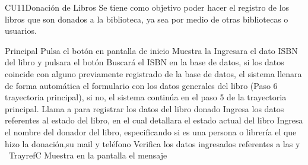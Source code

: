 	\begin{UseCase}{CU11}{Donación de Libros}{
		Se tiene como objetivo poder hacer el registro de los libros que son donados a la biblioteca, ya sea por medio de otras bibliotecas o usuarios.
}
	\end{UseCase}

	\begin{UCtrayectoria}{Principal}
		\UCpaso [\UCactor]Pulsa el botón  en pantalla de inicio
		\UCpaso Muestra la 
		\UCpaso [\UCactor] Ingresara el dato ISBN del libro y pulsara el botón  
		\UCpaso Buscará el ISBN en la base de datos, si los datos coincide con alguno previamente registrado de la base de datos, el sistema llenara de forma automática el formulario con los datos generales del libro (Paso 6 trayectoria principal), si no, el sistema continúa en el paso 5 de la trayectoria principal.
		\UCpaso [\UCactor] Llama a  para registrar los datos del libro donado
		\UCpaso [\UCactor] Ingresa los datos referentes al estado del libro, en el cual detallara el estado actual del libro
		\UCpaso [\UCactor] Ingresa el nombre del donador del libro, especificando si es una persona o librería el que hizo la donación,su mail y teléfono 
		\UCpaso Verifica los datos ingresados referentes a las  y   \ Trayref{C}
		\UCpaso Muestra en la pantalla el mensaje 
	\end{UCtrayectoria}
		
